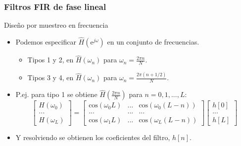 \documentclass[handout]{beamer}
\numberwithin{section}{part}
\begin{document}
\begin{frame}
  \frametitle{Filtros FIR de fase lineal}

  \alert{Diseño por muestreo en frecuencia}
  \begin{itemize}
    \item Podemos especificar $\hat H(\mathrm{e}^{j\omega})$ en un conjunto de frecuencias.
    \begin{itemize}
      \item Tipos 1 y 2, en $\hat H(\omega_n)$ para $\omega_n=\frac{2\pi n}{N}$.
      \item Tipos 3 y 4, en $\hat H(\omega_n)$ para $\omega_n=\frac{2\pi (n+1/2)}{N}$.
    \end{itemize}

    \item P.ej. para tipo 1 se obtiene $\hat H(\frac{2\pi n}{N})$ para $n=0,1,...,L$:
    \[
      \left[\begin{matrix}
        H(\omega_0)\\
        ...\\
        H(\omega_{L})
      \end{matrix}\right]=
      \left[\begin{matrix}
        \mathrm{cos}(\omega_0 L) & ... & \mathrm{cos}(\omega_0 (L-n)) \\
        ... & ... & ... \\
        \mathrm{cos}(\omega_1 L) & ... & \mathrm{cos}(\omega_L (L-n))
      \end{matrix}\right]
      \left[\begin{matrix}
       h[0]\\
       ...\\
       h[L]
      \end{matrix}\right]
    \]
    \item Y resolviendo se obtienen los coeficientes del filtro, $h[n]$.
  \end{itemize}
\end{frame}
\end{document}
